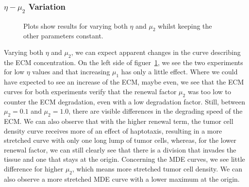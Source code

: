 \subsubsection*{$\eta -\mu_2$ Variation}
\begin{figure}[h!]
    \centering
    \caption{Plots show results for varying both $\eta$ and $\mu_2$ whilst keeping the other parameters constant.}
    \label{fig:prolif_eta_mu_2_variation}
\end{figure}

Varying both $\eta$ and $\mu_2$, we can expect apparent changes in the curve describing the ECM concentration. On the left side of figuer~\ref{fig:prolif_eta_mu_2_variation}, we see the two experiments for low $\eta$ values and that increasing $\mu_1$ has only a little effect. Where we could have expected to see an increase of the ECM, maybe even, we see that the ECM curves for both experiments verify that the renewal factor $\mu_2$ was too low to counter the ECM degradation, even with a low degradation factor. Still, between $\mu_2=0.1$ and $\mu_2=1.0$, there are visible differences in the degrading speed of the ECM. We can also observe that with the higher renewal term, the tumor cell density curve receives more of an effect of haptotaxis, resulting in a more stretched curve with only one long lump of tumor cells, whereas, for the lower renewal factor, we can still clearly see that there is a division that invades the tissue and one that stays at the origin. Concerning the MDE curves, we see little difference for higher $\mu_2$, which means more stretched tumor cell density. We can also observe a more stretched MDE curve with a lower maximum at the origin. 

